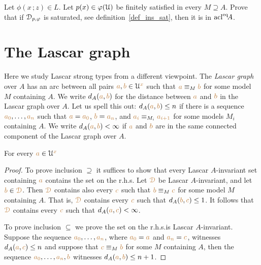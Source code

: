 \begin{exercise}
  Let $\phi(x\,;z)\in L$.
  Let $p(x)\in\varphi(\EuScript U)$ be finitely satisfied in every $M\supseteq A$.
  Prove that if $\EuScript D_{p,\varphi}$ is saturated, see definition~\ref{def_ins_sat}, then it is in ${\rm acl}^{{\rm eq}}\!A$.
\end{exercise}
\section{The Lascar graph}\label{lascar_graph}

Here we study Lascar strong types from a different viewpoint.
The \emph{Lascar graph\/} over $A$ has an arc between all pairs ${\color{brown} a},{\color{brown} b}\in \EuScript U^{\color{brown} x}$ such that  ${\color{brown} a}\equiv_M{\color{brown} b}$ for some model $M$ containing $A$.
We write \emph{$d_A({\color{brown} a},{\color{brown} b})$\/} for the distance between ${\color{brown} a}$ and ${\color{brown} b}$ in the Lascar graph over $A$.
Let us spell this out: $d_A({\color{brown} a},{\color{brown} b})\le n$ if there is a sequence ${\color{brown} a_0},\dots,{\color{brown} a_n}$ such that ${\color{brown} a}={\color{brown} a_0}$, ${\color{brown} b}={\color{brown} a_n}$, and ${\color{brown} a_i}\equiv_{M_i}{\color{brown} a_{i+1}}$ for some models $M_i$ containing $A$.
We write \emph{$d_A({\color{brown} a},{\color{brown} b})<\infty$\/} if ${\color{brown} a}$ and ${\color{brown} b}$ are in the same connected component of the Lascar graph over $A$.

\begin{proposition}\label{tipoforteLascarediametro}
  For every ${\color{brown} a}\in\EuScript U^{\color{brown} x}$

\end{proposition}


\begin{proof}
To prove inclusion $\supseteq$ it suffices to show that every Lascar $A$-invariant set containing ${\color{brown} a}$ contains the set on the r.h.s.
Let ${\color{brown}\EuScript D}$ be Lascar $A$-invariant, and let ${\color{brown} b}\in{\color{brown}\EuScript D}$.
Then ${\color{brown}\EuScript D}$ contains also every ${\color{brown} c}$ such that ${\color{brown} b}\equiv_M{\color{brown} c}$ for some model $M$ containing $A$.
That is, ${\color{brown}\EuScript D}$ contains every ${\color{brown} c}$ such that $d_A({\color{brown} b},{\color{brown} c})\le 1$.
It follows that ${\color{brown}\EuScript D}$ contains every ${\color{brown} c}$ such that $d_A({\color{brown} a},{\color{brown} c})<\infty$. 

To prove inclusion $\subseteq$ we prove the set on the r.h.s.\@ is Lascar $A$-invariant.
Suppose the sequence ${\color{brown} a_0},\dots,{\color{brown} a_n}$, where ${\color{brown} a_0}={\color{brown} a}$ and ${\color{brown} a_n}={\color{brown} c}$, witnesses $d_A({\color{brown} a},{\color{brown} c})\le n$ and suppose that ${\color{brown} c}\equiv_M{\color{brown} b}$ for some $M$ containing $A$, then the sequence ${\color{brown} a_0},\dots,{\color{brown} a_n},{\color{brown} b}$ witnesses $d_A({\color{brown} a},{\color{brown} b})\le n+1$.
\end{proof}

